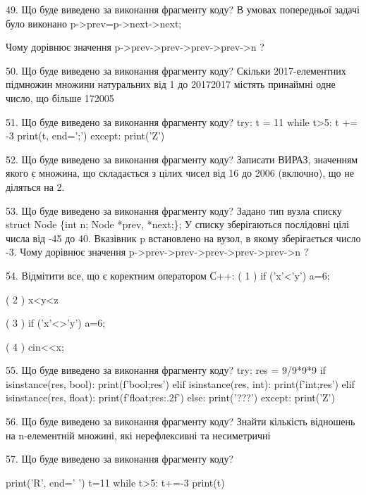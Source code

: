 \documentclass[11pt]{article}
\begin{document}

49. Що буде виведено за виконання фрагменту коду?
В умовах попередньої задачі було виконано p->prev=p->next->next;

Чому дорівнює значення p->prev->prev->prev->prev->n ?

50. Що буде виведено за виконання фрагменту коду?
Скільки 2017-елементних підмножин множини натуральних від 1 до 20172017 містять принаймні одне число, що більше 172005

51. Що буде виведено за виконання фрагменту коду?
try:
    t = 11
    while t>5:
        t += -3
    print(t, end=';')
except:
    print('Z')


52. Що буде виведено за виконання фрагменту коду?
Записати ВИРАЗ, значенням якого є множина, що складається з цілих чисел від 16 до 2006 (включно), що не діляться на 2.

53. Що буде виведено за виконання фрагменту коду?
Задано тип вузла списку
struct Node \{int n; Node *prev, *next;\};
У списку зберігаються послідовні цілі числа від -45 до 40. Вказівник p встановлено на вузол, в якому зберігається число -3.
Чому дорівнює значення p->prev->prev->prev->prev->prev->n ?

54. %
Відмітити все, що є коректним оператором С++:
( 1 ) if ('x'<'y') a=6;

( 2 ) x<y<z

( 3 ) if ('x'<>'y') a=6;

( 4 ) cin<<x;


55. Що буде виведено за виконання фрагменту коду?
try:
    res = 9/9*9*9
    if isinstance(res, bool):
        print(f'bool;{res}')
    elif isinstance(res, int):
        print(f'int;{res}')
    elif isinstance(res, float):
        print(f'float;{res:.2f}')
    else:
        print('???')
except:
    print('Z')


56. Що буде виведено за виконання фрагменту коду?
Знайти кількість відношень на n-елементній множині, які нерефлексивні та несиметричні

57. Що буде виведено за виконання фрагменту коду?

print('R', end=' ')
t=11
while t>5:
    t+=-3
print(t)


\end{document}
